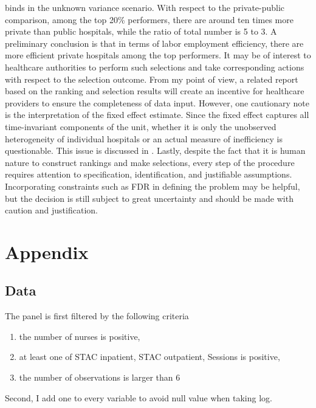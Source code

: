 \documentclass[12pt]{article}
\begin{document}
binds in the unknown variance scenario. With respect to the private-public
comparison, among the top 20\% performers, there are around ten times more
private than public hospitals, while the ratio of total number is 5 to 3. A
preliminary conclusion is that in terms of labor employment efficiency, there
are more efficient private hospitals among the top performers. It may be of
interest to healthcare authorities to perform such selections and take
corresponding actions with respect to the selection outcome. From my point of
view, a related report based on the ranking and selection results will create
an incentive for healthcare providers to ensure the completeness of data input.
However, one cautionary note is the interpretation of the fixed effect
estimate. Since the fixed effect captures all time-invariant components of the
unit, whether it is only the unobserved heterogeneity of individual hospitals
or an actual measure of inefficiency is questionable. This issue is discussed
in \citet{greene2005fixed}. Lastly, despite the fact that it is human nature to
construct rankings and make selections, every step of the procedure requires
attention to specification, identification, and justifiable assumptions.
Incorporating constraints such as FDR in defining the problem may be helpful,
but the decision is still subject to great uncertainty and should be made with
caution and justification.

\pagebreak
\newpage


\appendix
\section{Appendix}
\subsection{Data}

The panel is first filtered by the following criteria
\begin{enumerate}
    \item the number of nurses is positive,
    \item at least one of STAC inpatient, STAC outpatient, Sessions is positive,
    \item the number of observations is larger than 6
\end{enumerate}
Second, I add one to every variable to avoid null value when taking log.
\end{document}
